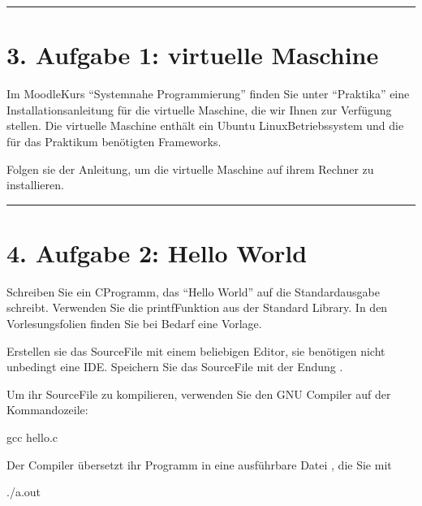 \documentclass[a4paper,10pt,english]{report}
\begin{document}
\bigskip\hrule\bigskip



\section{3. Aufgabe 1: virtuelle Maschine}
\label{\detokenize{P01_Erste_Schritte_mit_C/README:aufgabe-1-virtuelle-maschine}}
\sphinxAtStartPar
Im Moodle\sphinxhyphen{}Kurs “Systemnahe Programmierung” finden Sie unter “Praktika” eine Installationsanleitung für die virtuelle Maschine, die wir Ihnen zur Verfügung stellen. Die virtuelle Maschine enthält ein Ubuntu Linux\sphinxhyphen{}Betriebssystem und die für das Praktikum benötigten Frameworks.

\sphinxAtStartPar
Folgen sie der Anleitung, um die virtuelle Maschine auf ihrem Rechner zu installieren.


\bigskip\hrule\bigskip



\section{4. Aufgabe 2: Hello World}
\label{\detokenize{P01_Erste_Schritte_mit_C/README:aufgabe-2-hello-world}}
\sphinxAtStartPar
Schreiben Sie ein C\sphinxhyphen{}Programm, das “Hello World” auf die Standardausgabe schreibt. Verwenden Sie die printf\sphinxhyphen{}Funktion aus der Standard Library. In den Vorlesungsfolien finden Sie bei Bedarf eine Vorlage.

\sphinxAtStartPar
Erstellen sie das Source\sphinxhyphen{}File mit einem beliebigen Editor, sie benötigen nicht unbedingt eine IDE. Speichern Sie das Source\sphinxhyphen{}File mit der Endung .

\sphinxAtStartPar
Um ihr Source\sphinxhyphen{}File zu kompilieren, verwenden Sie den GNU Compiler auf der Kommandozeile:

\begin{sphinxVerbatim}[commandchars=\\\{\}]
\PYGZdl{}\PYGZgt{} gcc hello.c
\end{sphinxVerbatim}

\sphinxAtStartPar
Der Compiler übersetzt ihr Programm in eine ausführbare Datei , die Sie mit

\begin{sphinxVerbatim}[commandchars=\\\{\}]
\PYGZdl{}\PYGZgt{} ./a.out
\end{sphinxVerbatim}
\end{document}
